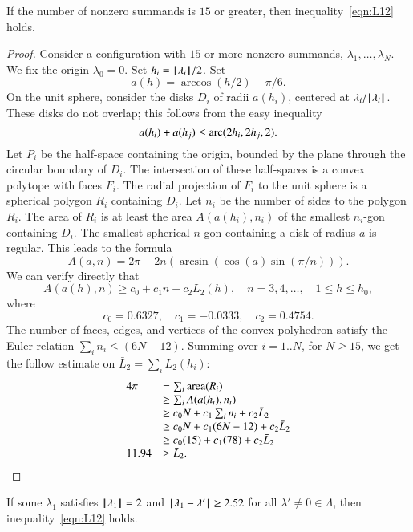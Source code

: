 \begin{lemma}  If the number of nonzero summands is $15$ or greater, then inequality~\ref{eqn:L12} holds.
\end{lemma}

\begin{proof} 
Consider a configuration with $15$ or more nonzero summands, $\lambda_1,\ldots,\lambda_N$. 
We fix the origin $\lambda_0=0$.  Set $h_i = {{\hskip0.1em|\hskip-0.15em|\hskip0.1em}\lambda_i{\hskip0.1em|\hskip-0.15em|\hskip0.1em}}/2$.  Set
$$
a(h) = \arccos(h/2) - \pi/6.
$$
On the unit sphere,  consider the disks $D_i$ of radii $a(h_i)$, centered at $\lambda_i/{{\hskip0.1em|\hskip-0.15em|\hskip0.1em}\lambda_i{\hskip0.1em|\hskip-0.15em|\hskip0.1em}}$.  These disks do not overlap; this follows from the easy inequality 
$$
a(h_i) + a(h_j) \le {\operatorname{arc}}(2h_i,2h_j,2).
$$
Let $P_i$ be the half-space containing the origin, bounded by the plane through the circular boundary of $D_i$.  The intersection of these half-spaces is a convex polytope with faces $F_i$.  The radial projection of $F_i$ to the unit sphere is a spherical polygon $R_i$ containing $D_i$.  Let $n_i$ be the number of sides to the polygon $R_i$.  The area of $R_i$ is at least the area $A(a(h_i),n_i)$ of the smallest $n_i$-gon containing $D_i$.  The smallest spherical $n$-gon containing a disk of radius $a$ is regular.  This leads to the formula
$$
A(a,n) = 2\pi - 2 n (\arcsin(\cos(a)\sin(\pi/n))).
$$
We can verify directly that
$$
A(a(h),n) \ge c_0 + c_1 n + c_2 L_2(h),\quad
n = 3,4,\ldots,\quad 1\le h\le h_0,
$$
where
$$c_0 = 0.6327,\quad c_1 = -0.0333,\quad c_2 = 0.4754.$$
The number of faces, edges, and vertices of the convex
polyhedron satisfy the Euler relation $\sum_i n_i \le (6N-12)$.
Summing over $i=1..N$, for $N\ge 15$, we get the follow
estimate on $\bar L_2 = \sum_i L_2(h_i)$:
$$
\begin{array}{lll}
4\pi &= \sum_i{\operatorname{area}}(R_i)\\
     &\ge \sum_i A(a(h_i),n_i) \\
     &\ge c_0 N +c_1\sum_i n_i + c_2 \bar L_2\\
     &\ge c_0 N +c_1 (6N-12) + c_2 \bar L_2\\
     &\ge c_0 (15) +c_1 (78) + c_2 \bar L_2\\
11.94 &\ge \bar L_2. 
\end{array}
$$
\end{proof} 


\begin{lemma}\label{lemma:D'}  
If some $\lambda_1$ satisfies ${{\hskip0.1em|\hskip-0.15em|\hskip0.1em}\lambda_1{\hskip0.1em|\hskip-0.15em|\hskip0.1em}}=2$ and
${\hskip0.1em|\hskip-0.15em|\hskip0.1em}\lambda_1 - \lambda'{\hskip0.1em|\hskip-0.15em|\hskip0.1em}\ge 2.52$ for all $\lambda'\ne0\in\Lambda$,
then  inequality~\ref{eqn:L12} holds.
\end{lemma}

